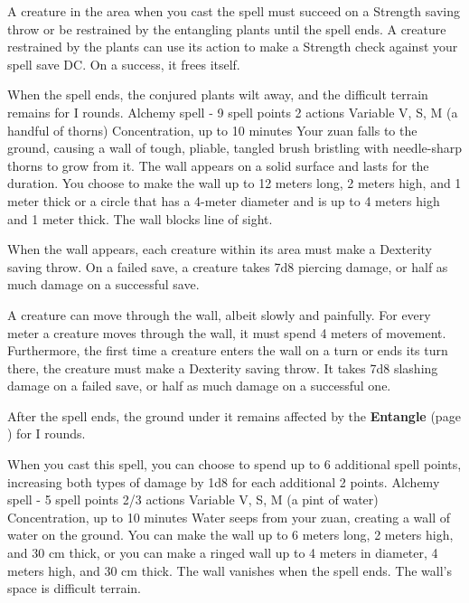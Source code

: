         A creature in the area when you cast the spell must succeed on a Strength saving throw or be restrained by the entangling plants until the spell ends.
        A creature restrained by the plants can use its action to make a Strength check against your spell save DC.
        On a success, it frees itself.

        When the spell ends, the conjured plants wilt away, and the difficult terrain remains for I rounds.
        {Alchemy spell - 9 spell points}
        {2 actions}
        {Variable}
        {V, S, M (a handful of thorns)}
        {Concentration, up to 10 minutes}
        Your zuan falls to the ground, causing a wall of tough, pliable, tangled brush bristling with needle-sharp thorns to grow from it.
        The wall appears on a solid surface and lasts for the duration.
        You choose to make the wall up to 12 meters long, 2 meters high, and 1 meter thick or a circle that has a 4-meter diameter and is up to 4 meters high and 1 meter thick.
        The wall blocks line of sight.

        When the wall appears, each creature within its area must make a Dexterity saving throw.
        On a failed save, a creature takes 7d8 piercing damage, or half as much damage on a successful save.

        A creature can move through the wall, albeit slowly and painfully.
        For every meter a creature moves through the wall, it must spend 4 meters of movement.
        Furthermore, the first time a creature enters the wall on a turn or ends its turn there, the creature must make a Dexterity saving throw.
        It takes 7d8 slashing damage on a failed save, or half as much damage on a successful one.

        After the spell ends, the ground under it remains affected by the \textbf{Entangle} (page \pageref{spell::entangle}) for I rounds.

        When you cast this spell, you can choose to spend up to 6 additional spell points, increasing both types of damage by 1d8 for each additional 2 points.
        {Alchemy spell - 5 spell points}
        {2/3 actions}
        {Variable}
        {V, S, M (a pint of water)}
        {Concentration, up to 10 minutes}
        Water seeps from your zuan, creating a wall of water on the ground.
        You can make the wall up to 6 meters long, 2 meters high, and 30 cm thick, or you can make a ringed wall up to 4 meters in diameter, 4 meters high, and 30 cm thick.
        The wall vanishes when the spell ends.
        The wall's space is difficult terrain.

